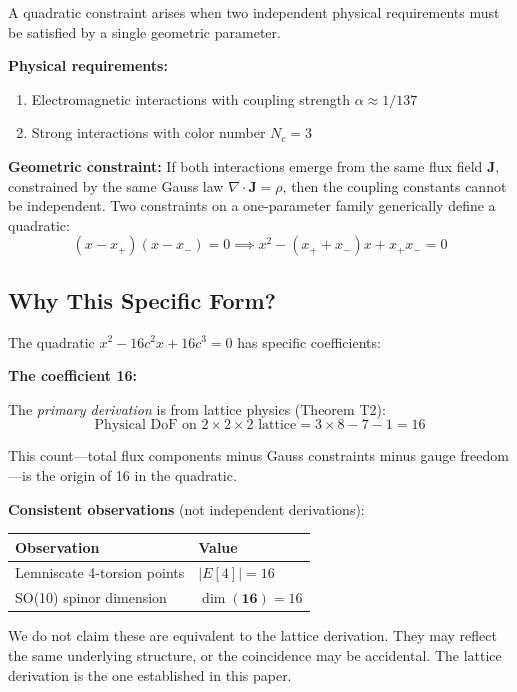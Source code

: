 \documentclass[11pt,a4paper]{article}
\theoremstyle{definition}
\theoremstyle{remark}
\begin{document}
A quadratic constraint arises when two independent physical requirements must be satisfied by a single geometric parameter.

\textbf{Physical requirements:}
\begin{enumerate}
    \item Electromagnetic interactions with coupling strength $\alpha \approx 1/137$
    \item Strong interactions with color number $N_c = 3$
\end{enumerate}

\textbf{Geometric constraint:}
If both interactions emerge from the same flux field $\mathbf{J}$, constrained by the same Gauss law $\nabla \cdot \mathbf{J} = \rho$, then the coupling constants cannot be independent. Two constraints on a one-parameter family generically define a quadratic:
\begin{equation}
    (x - x_+)(x - x_-) = 0 \implies x^2 - (x_+ + x_-)x + x_+x_- = 0
\end{equation}

\subsection{Why This Specific Form?}

The quadratic $x^2 - 16c^2 x + 16c^3 = 0$ has specific coefficients:

\textbf{The coefficient 16:}

The \emph{primary derivation} is from lattice physics (Theorem T2):
\begin{equation}
    \text{Physical DoF on } 2\times2\times2 \text{ lattice} = 3 \times 8 - 7 - 1 = 16
\end{equation}

This count---total flux components minus Gauss constraints minus gauge freedom---is the origin of 16 in the quadratic.

\textbf{Consistent observations} (not independent derivations):
\begin{center}
\begin{tabular}{ll}
\toprule
Observation & Value \\
\midrule
Lemniscate 4-torsion points & $|E[4]| = 16$ \\
SO(10) spinor dimension & $\dim(\mathbf{16}) = 16$ \\
\bottomrule
\end{tabular}
\end{center}

We do not claim these are equivalent to the lattice derivation. They may reflect the same underlying structure, or the coincidence may be accidental. The lattice derivation is the one established in this paper.
\end{document}
